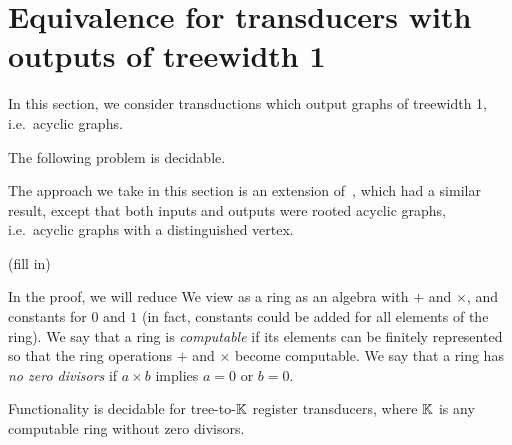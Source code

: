 
\section{Equivalence for transducers with outputs of treewidth 1}
In this section, we consider transductions which output graphs of treewidth 1, i.e.~acyclic graphs. 

\begin{theorem} The following problem is decidable.
\end{theorem}

The approach we take in this section is an extension of~\cite[Section 3.3]{boiretReducingTransducerEquivalence2018}, which had a similar result, except that both inputs and outputs were rooted acyclic graphs, i.e.~acyclic graphs with a distinguished vertex. 

\begin{center}
    (fill in)
\end{center}

In the proof, we will reduce 
We view as a ring as an algebra with $+$ and $\times$, and constants for $0$ and $1$ (in fact, constants could be added for all elements of the ring). We say that a ring is \emph{computable} if its elements can be finitely represented so that the ring operations $+$ and $\times$ become computable. We say that a ring has  \emph{no zero divisors} if $a \times b$ implies $a = 0$ or $b=0$.


\begin{theorem}
    Functionality is decidable for tree-to-$\mathbb K$ register transducers, where $\mathbb K$ is any computable ring without zero divisors. 
\end{theorem}